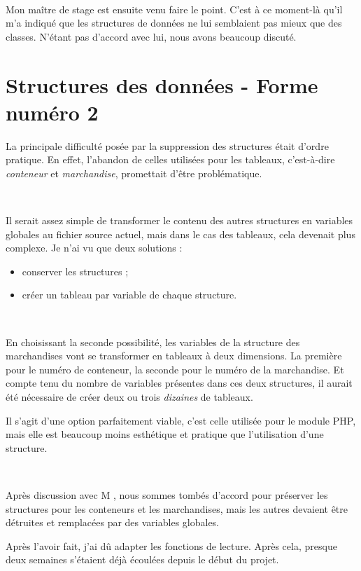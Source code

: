 ~

Mon maître de stage est ensuite venu faire le point. C'est à ce moment-là qu'il m'a indiqué que les structures de données ne lui semblaient pas mieux que des classes. N'étant pas d'accord avec lui, nous avons beaucoup discuté.


\section{Structures des données - Forme numéro 2}
La principale difficulté posée par la suppression des structures était d'ordre pratique. En effet, l'abandon de celles utilisées pour les tableaux, c'est-à-dire \emph{conteneur} et \emph{marchandise}, promettait d'être problématique.

~

Il serait assez simple de transformer le contenu des autres structures en variables globales au fichier source actuel, mais dans le cas des tableaux, cela devenait plus complexe. Je n'ai vu que deux solutions :
\begin{itemize}
	\item conserver les structures ;
	\item créer un tableau par variable de chaque structure.
\end{itemize}

~

En choisissant la seconde possibilité, les variables de la structure des marchandises vont se transformer en tableaux à deux dimensions. La première pour le numéro de conteneur, la seconde pour le numéro de la marchandise. Et compte tenu du nombre de variables présentes dans ces deux structures, il aurait été nécessaire de créer deux ou trois \emph{dizaines} de tableaux.

Il s'agit d'une option parfaitement viable, c'est celle utilisée pour le module PHP, mais elle est beaucoup moins esthétique et pratique que l'utilisation d'une structure.

~

Après discussion avec M , nous sommes tombés d'accord pour préserver les structures pour les conteneurs et les marchandises, mais les autres devaient être détruites et remplacées par des variables globales.

Après l'avoir fait, j'ai dû adapter les fonctions de lecture. Après cela, presque deux semaines s'étaient déjà écoulées depuis le début du projet.
\vfill